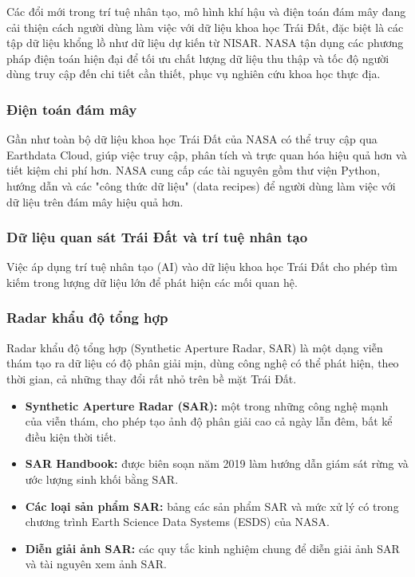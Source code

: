 Các đổi mới trong trí tuệ nhân tạo, mô hình khí hậu và điện toán đám mây đang cải thiện cách người dùng làm việc với dữ liệu khoa học Trái Đất, đặc biệt là các tập dữ liệu khổng lồ như dữ liệu dự kiến từ NISAR. NASA tận dụng các phương pháp điện toán hiện đại để tối ưu chất lượng dữ liệu thu thập và tốc độ người dùng truy cập đến chi tiết cần thiết, phục vụ nghiên cứu khoa học thực địa.

\subsubsection{Điện toán đám mây}

Gần như toàn bộ dữ liệu khoa học Trái Đất của NASA có thể truy cập qua Earthdata Cloud, giúp việc truy cập, phân tích và trực quan hóa hiệu quả hơn và tiết kiệm chi phí hơn. NASA cung cấp các tài nguyên gồm thư viện Python, hướng dẫn và các "công thức dữ liệu" (data recipes) để người dùng làm việc với dữ liệu trên đám mây hiệu quả hơn.

\subsubsection{Dữ liệu quan sát Trái Đất và trí tuệ nhân tạo}

Việc áp dụng trí tuệ nhân tạo (AI) vào dữ liệu khoa học Trái Đất cho phép tìm kiếm trong lượng dữ liệu lớn để phát hiện các mối quan hệ.

\subsubsection{Radar khẩu độ tổng hợp}

Radar khẩu độ tổng hợp (Synthetic Aperture Radar, SAR) là một dạng viễn thám tạo ra dữ liệu có độ phân giải mịn, dùng công nghệ có thể phát hiện, theo thời gian, cả những thay đổi rất nhỏ trên bề mặt Trái Đất.

\begin{itemize}
\item
  \textbf{Synthetic Aperture Radar (SAR):} một trong những công nghệ mạnh của viễn thám, cho phép tạo ảnh độ phân giải cao cả ngày lẫn đêm, bất kể điều kiện thời tiết.
\item
  \textbf{SAR Handbook:} được biên soạn năm 2019 làm hướng dẫn giám sát rừng và ước lượng sinh khối bằng SAR.
\item
  \textbf{Các loại sản phẩm SAR:} bảng các sản phẩm SAR và mức xử lý có trong chương trình Earth Science Data Systems (ESDS) của NASA.
\item
  \textbf{Diễn giải ảnh SAR:} các quy tắc kinh nghiệm chung để diễn giải ảnh SAR và tài nguyên xem ảnh SAR.
\end{itemize}

